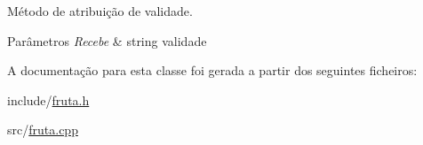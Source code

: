 Método de atribuição de validade. 


\begin{DoxyParams}{Parâmetros}
{\em Recebe} & string validade \\
\hline
\end{DoxyParams}


A documentação para esta classe foi gerada a partir dos seguintes ficheiros\-:\begin{DoxyCompactItemize}
\item 
include/\hyperlink{fruta_8h}{fruta.\-h}\item 
src/\hyperlink{fruta_8cpp}{fruta.\-cpp}\end{DoxyCompactItemize}
